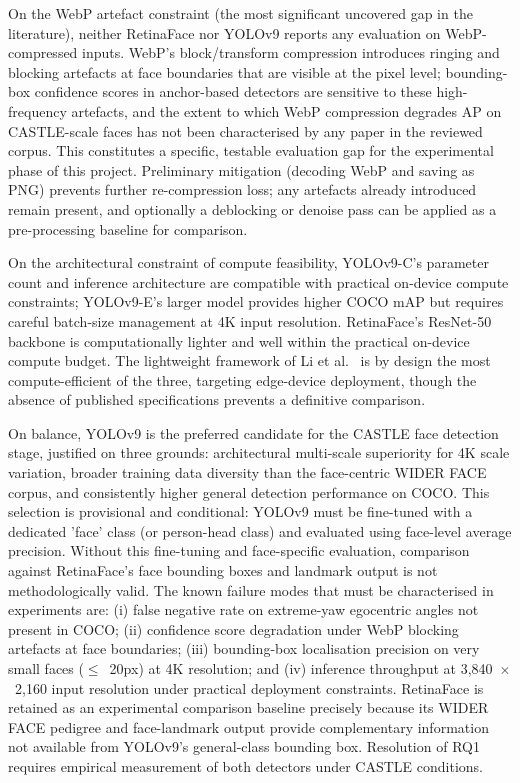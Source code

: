 \documentclass[12pt, onecolumn]{IEEEtran}
\begin{document}
On the WebP artefact constraint (the most significant uncovered gap in the literature), neither
RetinaFace nor YOLOv9 reports any evaluation on WebP-compressed inputs. WebP's block/transform
compression introduces ringing and blocking artefacts at face boundaries that are visible at the pixel level;
bounding-box confidence scores in anchor-based detectors are sensitive to these high-frequency artefacts, and
the extent to which WebP compression degrades AP on CASTLE-scale faces has not been characterised by any
paper in the reviewed corpus. This constitutes a specific, testable evaluation gap for the experimental phase
of this project. Preliminary mitigation (decoding WebP and saving as PNG) prevents further
re-compression loss; any artefacts already introduced remain present, and optionally a deblocking or denoise
pass can be applied as a pre-processing baseline for comparison.

On the architectural constraint of compute feasibility, YOLOv9-C's parameter count and inference architecture
are compatible with practical on-device compute constraints; YOLOv9-E's larger
model provides higher COCO mAP but requires careful batch-size management at 4K input resolution.
RetinaFace's ResNet-50 backbone is computationally lighter and well within the practical on-device compute budget. The
lightweight framework of Li et al.\ \cite{li2025lightweight} is by design the most compute-efficient of the three, targeting
edge-device deployment, though the absence of published specifications prevents a definitive comparison.

On balance, YOLOv9 is the preferred candidate for the CASTLE face detection stage, justified on three
grounds: architectural multi-scale superiority for 4K scale variation, broader training data diversity than
the face-centric WIDER FACE corpus, and consistently higher general detection performance on COCO. This
selection is provisional and conditional: YOLOv9 must be fine-tuned with a dedicated 'face' class (or
person-head class) and evaluated using face-level average precision. Without this fine-tuning and
face-specific evaluation, comparison against RetinaFace's face bounding boxes and landmark output is not
methodologically valid. The known failure modes that must be characterised in experiments are: (i) false
negative rate on extreme-yaw egocentric angles not present in COCO; (ii) confidence score degradation under
WebP blocking artefacts at face boundaries; (iii) bounding-box localisation precision on very small faces
($\leq$~20px) at 4K resolution; and (iv) inference throughput at 3,840~$\times$~2,160 input resolution under practical deployment constraints. RetinaFace is retained as an experimental comparison baseline precisely because its WIDER
FACE pedigree and face-landmark output provide complementary information not available from YOLOv9's
general-class bounding box. Resolution of RQ1 requires empirical measurement of both detectors under CASTLE
conditions.
\end{document}
